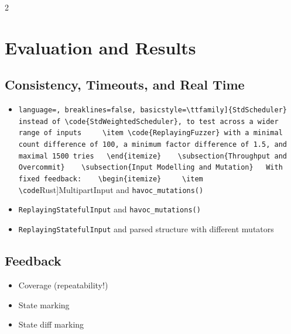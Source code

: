\documentclass{article}
\newcommand{\code}[2][]{\lstinline[language=#1, breaklines=false, basicstyle=\ttfamily]{#2}}
\begin{document}
\begin{multicols}{2}

  \section{Evaluation and Results}
  \label{Results}

  \subsection{Consistency, Timeouts, and Real Time}

  \begin{itemize}
    \item \code{StdScheduler} instead of \code{StdWeightedScheduler}, to test across a wider range of inputs
    \item \code{ReplayingFuzzer} with a minimal count difference of 100, a minimum factor difference of 1.5, and maximal 1500 tries
  \end{itemize}

  \subsection{Throughput and Overcommit}

  \subsection{Input Modelling and Mutation}
  With fixed feedback:

  \begin{itemize}
    \item \code[Rust]{MultipartInput} and \code[Rust]{havoc_mutations()}
    \item \code[Rust]{ReplayingStatefulInput} and \code[Rust]{havoc_mutations()}
    \item \code[Rust]{ReplayingStatefulInput} and parsed structure with different mutators
  \end{itemize}

  \subsection{Feedback}
  \begin{itemize}
    \item Coverage (repeatability!)
    \item State marking
    \item State diff marking
  \end{itemize}


\end{multicols}
\end{document}
